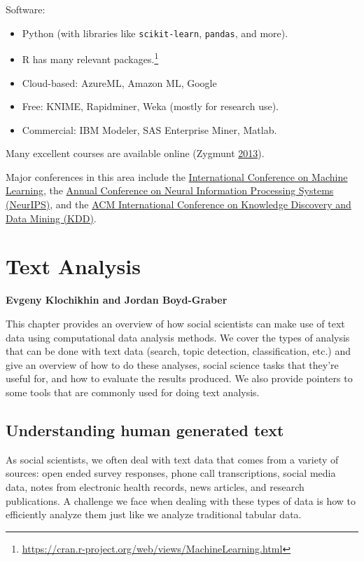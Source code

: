 \documentclass[]{krantz}
\begin{document}
Software:

\begin{itemize}
\item
  Python (with libraries like \texttt{scikit-learn}, \texttt{pandas},
  and more).
\item
  R has many relevant packages.\footnote{\url{https://cran.r-project.org/web/views/MachineLearning.html}}
\item
  Cloud-based: AzureML, Amazon ML, Google
\item
  Free: KNIME, Rapidminer, Weka (mostly for research use).
\item
  Commercial: IBM Modeler, SAS Enterprise Miner, Matlab.
\end{itemize}

Many excellent courses are available online (Zygmunt
\protect\hyperlink{ref-MLcourses}{2013}).

Major conferences in this area include the
\href{https://icml.cc/}{International Conference on Machine Learning},
the \href{https://nips.cc/}{Annual Conference on Neural Information
Processing Systems (NeurIPS)}, and the \href{https://www.kdd.org/}{ACM
International Conference on Knowledge Discovery and Data Mining (KDD)}.

\hypertarget{chap:text}{\chapter{Text Analysis}\label{chap:text}}

\textbf{Evgeny Klochikhin and Jordan Boyd-Graber}

This chapter provides an overview of how social scientists can make use
of text data using computational data analysis methods. We cover the
types of analysis that can be done with text data (search, topic
detection, classification, etc.) and give an overview of how to do these
analyses, social science tasks that they're useful for, and how to
evaluate the results produced. We also provide pointers to some tools
that are commonly used for doing text analysis.

\section{Understanding human generated
text}\label{understanding-human-generated-text}

As social scientists, we often deal with text data that comes from a
variety of sources: open ended survey responses, phone call
transcriptions, social media data, notes from electronic health records,
news articles, and research publications. A challenge we face when
dealing with these types of data is how to efficiently analyze them just
like we analyze traditional tabular data.
\end{document}
